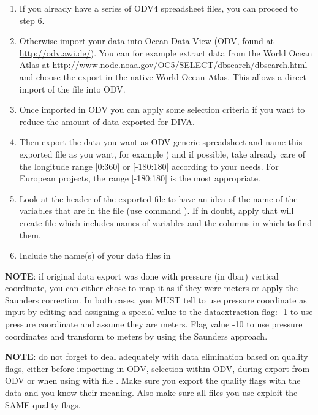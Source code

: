 \documentclass[a4paper,12pt,oneside,notitlepage]{book}
\newcommand{\file}[1]{\texttt{\color{MidnightBlue}{#1}}}
\newcommand{\command}[1]{\texttt{\color{RedOrange}{#1}}}
\newcommand{\diva}{DIVA}
\begin{document}
\begin{enumerate}
\item If you already have a series of ODV4 spreadsheet files, you can proceed to step 6.
\item Otherwise import your data into Ocean Data View (ODV, found at \url{http://odv.awi.de/}). You can for example extract data from the World Ocean Atlas at \url{http://www.nodc.noaa.gov/OC5/SELECT/dbsearch/dbsearch.html} and choose the export in the native World Ocean Atlas. This allows a direct import of the file into ODV.
\item Once imported in ODV you can apply some selection criteria if you want to reduce the amount of data exported for \diva. 
\item Then export the data you want as ODV generic spreadsheet and name this exported file as you want, for example \file{woaODV.txt}) and if possible, take already care of the longitude range  $[$0:360$]$ or $[$-180:180$]$ according to your needs. For European projects, the range $[$-180:180$]$ is the most appropriate.
\item Look at the header of the exported file to have an idea of the name of the variables that are in the file (use command \command{head -40 woaODV.txt}). If in doubt, apply \command{divaguessforms woaODV.txt} that will create file \file{ODVcolumns} which includes names of variables and the columns in which to find them.
\item Include the name(s) of your data files in \file{datasource}
\end{enumerate}

{\bf NOTE}: if original data export was done with pressure (in dbar) vertical coordinate, you can either chose to map it as if they were meters or apply the Saunders correction. In both cases, you MUST tell \file{divaselectorODV4} to use pressure coordinate as input by editing \file{driver} and assigning a special value to the dataextraction flag: -1 to use pressure coordinate and assume they are meters. Flag value -10 to use pressure coordinates and transform to meters by using the Saunders approach.

{\bf NOTE}: do not forget to deal adequately with data elimination based on quality flags, either before importing in ODV, selection within ODV, during export from ODV or when using \file{divaselectorODV4} with file \file{qflist}. Make sure  you export the quality flags with the data and you know their meaning. Also make sure all files you use exploit the SAME quality flags.
\end{document}
